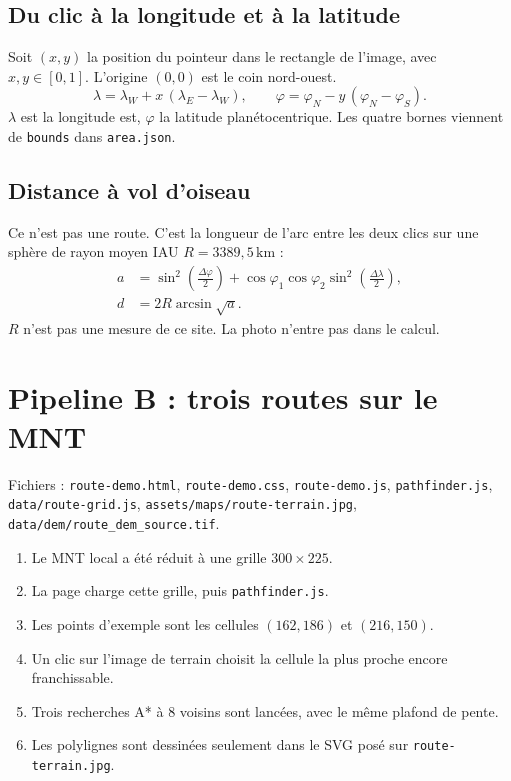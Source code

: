 \documentclass[11pt,a4paper]{article}
\begin{document}
\subsection{Du clic à la longitude et à la latitude}

Soit \((x,y)\) la position du pointeur dans le rectangle de l'image, avec
\(x,y\in[0,1]\). L'origine \((0,0)\) est le coin nord-ouest.
\[
\lambda = \lambda_W + x\,(\lambda_E-\lambda_W),
\qquad
\varphi = \varphi_N - y\,(\varphi_N-\varphi_S).
\]
\(\lambda\) est la longitude est, \(\varphi\) la latitude planétocentrique.
Les quatre bornes viennent de \texttt{bounds} dans \texttt{area.json}.

\subsection{Distance à vol d'oiseau}

Ce n'est pas une route. C'est la longueur de l'arc entre les deux clics sur une sphère
de rayon moyen IAU \(R=3389{,}5\,\mathrm{km}\) :
\begin{align*}
a &= \sin^2\!\left(\frac{\Delta\varphi}{2}\right)
  + \cos\varphi_1\cos\varphi_2\sin^2\!\left(\frac{\Delta\lambda}{2}\right),\\
d &= 2R\arcsin\sqrt{a}.
\end{align*}
\(R\) n'est pas une mesure de ce site. La photo n'entre pas dans le calcul.

\section{Pipeline B : trois routes sur le MNT}

Fichiers : \texttt{route-demo.html}, \texttt{route-demo.css}, \texttt{route-demo.js},
\texttt{pathfinder.js}, \texttt{data/route-grid.js},
\texttt{assets/maps/route-terrain.jpg},
\texttt{data/dem/route\_dem\_source.tif}.

\begin{enumerate}
  \item Le MNT local a été réduit à une grille \(300\times 225\).
  \item La page charge cette grille, puis \texttt{pathfinder.js}.
  \item Les points d'exemple sont les cellules \((162,186)\) et \((216,150)\).
  \item Un clic sur l'image de terrain choisit la cellule la plus proche encore franchissable.
  \item Trois recherches A* à 8 voisins sont lancées, avec le même plafond de pente.
  \item Les polylignes sont dessinées seulement dans le SVG posé sur \texttt{route-terrain.jpg}.
\end{enumerate}
\end{document}
